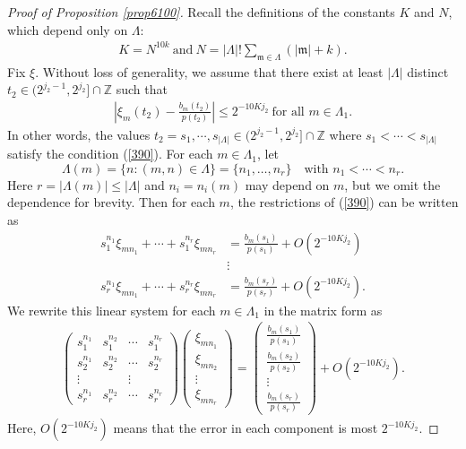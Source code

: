 \documentclass[11 pt,letterpaper]{amsart}
\theoremstyle{plain}
\theoremstyle{definition}
\theoremstyle{remark} \theoremstyle{exam} \theoremstyle{ob}
\numberwithin{equation}{section}
\begin{document}
\begin{proof}[Proof of Proposition \ref{prop6100}] 
Recall the definitions of the constants  $K$ and $N$, which depend only on $\Lambda$:
\begin{align*}
	K=N^{10k}\ \text{and}\ N=\lvert\Lambda\rvert!\sum_{\mathfrak{m}\in \Lambda} (|\mathfrak{m}|+k).
\end{align*} Fix $\xi$. Without loss of generality, we assume that 
there exist at least $|\Lambda|$ distinct  $t_2 \in (2^{j_2-1},2^{j_2}]\cap \mathbb{Z}$ such that
\begin{align} \label{390}
 \left|\xi_m(t_2)-\frac{b_m(t_2)}{p(t_2)}\right|\le 2^{-10Kj_2} \ \text{for all $m\in \Lambda_1$}.
\end{align}
In other words, the values $t_2=s_1,\cdots, s_{|\Lambda|} \in (2^{j_2-1},2^{j_2}]\cap \mathbb{Z}$ where 
   $s_1<\cdots<s_{|\Lambda|}$ satisfy the condition (\ref{390}).
 For each $m\in \Lambda_1$, let  $$\Lambda(m)=\{n: (m,n)\in \Lambda\}=
\{n_{1},\dots,n_{r}\} \quad \text{with } n_{1}<\cdots<n_{r}
.$$ Here $r=|\Lambda(m)|\le |\Lambda|$ and $n_i=n_i(m)$ may depend on $m$, but we omit the dependence  
  for brevity.  Then for each $m$, the  restrictions of (\ref{390}) can be written as 
\begin{align*}
s_1^{n_1}\xi_{mn_1}+\cdots+s_1^{n_{r}}\xi_{mn_{r}}&=\frac{b_m(s_1)}{p(s_1)}+O(2^{-10Kj_2})\\
&\vdots\\
s_{r}^{n_1}\xi_{mn_1}+\cdots+s_{r}^{n_{r}}\xi_{mn_{r}}&=\frac{b_m(s_{r})}{p(s_{r})}+O(2^{-10Kj_2}).
\end{align*}
We rewrite  this linear system  for each $m\in \Lambda_1$  in the matrix form as
\begin{align}\label{meg1}
\left(\begin{matrix}s_1^{n_{1}}&s_1^{n_{2}}& \cdots&s_1^{n_{r}}\\
s_2^{n_{1}}&s_2^{n_{2}}& \cdots&s_2^{n_{r}}\\
\vdots& &\vdots\\
s_{r}^{n_{1}}&s_{r}^{n_{2}}& \cdots&s_{r}^{n_{r}}
  \end{matrix}\right) \left(\begin{matrix}\xi_{mn_1}\\
\xi_{mn_2}\\
 \vdots\\
\xi_{mn_r}
  \end{matrix}\right)=\left(\begin{matrix}\frac{b_m(s_1)}{p(s_1)}\\
\frac{b_m(s_2)}{p(s_2)}\\
 \vdots\\
\frac{b_m(s_r)}{p(s_r)}
  \end{matrix}\right)+O(2^{-10Kj_2}).
\end{align}
Here,  $O(2^{-10Kj_2})$ means that the error in each component is  most $2^{-10Kj_2}$.




\end{proof}
\end{document}
